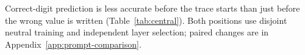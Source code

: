 Correct-digit prediction is less accurate before the trace starts than just before the wrong value is written (Table~\ref{tab:central}). Both positions use disjoint neutral training and independent layer selection; paired changes are in Appendix~\ref{app:prompt-comparison}.

